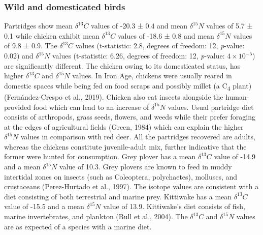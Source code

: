\documentclass[review]{elsarticle} %
\begin{document}
\hypertarget{wild-and-domesticated-birds}{%
\subsubsection{Wild and domesticated birds}\label{wild-and-domesticated-birds}}

Partridges show mean \(\delta ^{13}C\) values of -20.3 ± 0.4\text{\textperthousand} and mean \(\delta ^{15}N\) values of 5.7 ± 0.1\text{\textperthousand} while chicken exhibit mean \(\delta ^{13}C\) values of -18.6 ± 0.8\text{\textperthousand} and mean \(\delta ^{15}N\) values of 9.8 ± 0.9\text{\textperthousand}. The \(\delta ^{13}C\) values (t-statistic: 2.8, degrees of freedom: 12, \emph{p}-value: 0.02) and \(\delta ^{15}N\) values (t-statistic: 6.26, degrees of freedom: 12, \emph{p}-value: \ensuremath{4\times 10^{-5}}) are significantly different. The chicken owing to its domesticated status, has higher \(\delta ^{13}C\) and \(\delta ^{15}N\) values. In Iron Age, chickens were usually reared in domestic spaces while being fed on food scraps and possibly millet (a C\textsubscript{4} plant) (Fernández-Crespo et al., 2019). Chicken also eat insects alongside the human-provided food which can lead to an increase of \(\delta ^{15}N\) values. Usual partridge diet consists of arthropods, grass seeds, flowers, and weeds while their prefer foraging at the edges of agricultural fields (Green, 1984) which can explain the higher \(\delta ^{15}N\) values in comparison with red deer. All the partridges recovered are adults, whereas the chickens constitute juvenile-adult mix, further indicative that the former were hunted for consumption. Grey plover has a mean \(\delta ^{13}C\) value of -14.9\text{\textperthousand} and a mean \(\delta ^{15}N\) value of 10.3\text{\textperthousand}. Grey plovers are known to feed in muddy intertidal zones on insects (such as Coleoptera, polychaetes), molluscs, and crustaceans (Perez-Hurtado et al., 1997). The isotope values are consistent with a diet consisting of both terrestrial and marine prey. Kittiwake has a mean \(\delta ^{13}C\) value of -15.5\text{\textperthousand} and a mean \(\delta ^{15}N\) value of 13.9\text{\textperthousand}. Kittiwake's diet consists of fish, marine invertebrates, and plankton (Bull et al., 2004). The \(\delta ^{13}C\) and \(\delta ^{15}N\) values are as expected of a species with a marine diet.
\end{document}

